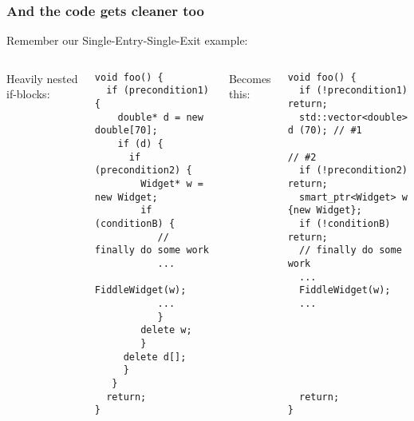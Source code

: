 \begin{frame}[fragile,t]
\frametitle{And the code gets cleaner too}
Remember our Single-Entry-Single-Exit example:
\vskip 6pt
\begin{columns}[t]
Heavily nested if-blocks:
{\scriptsize\begin{verbatim}
void foo() {
  if (precondition1) {
    double* d = new double[70];
    if (d) {
      if (precondition2) {
        Widget* w = new Widget;
        if (conditionB) {
           // finally do some work
           ...
           FiddleWidget(w);
           ...
           }
        delete w;
        }
     delete d[];
     }
   }
  return;
}
\end{verbatim}}
\pause{}
Becomes this:
{\scriptsize\begin{verbatim}
void foo() {
  if (!precondition1)  return;
  std::vector<double> d (70); // #1
                              // #2
  if (!precondition2) return;
  smart_ptr<Widget> w {new Widget};
  if (!conditionB) return;
  // finally do some work
  ...
  FiddleWidget(w);
  ...






  return;
}
\end{verbatim}}
\end{columns}
\pause{}
\vskip 6pt
\end{frame}
